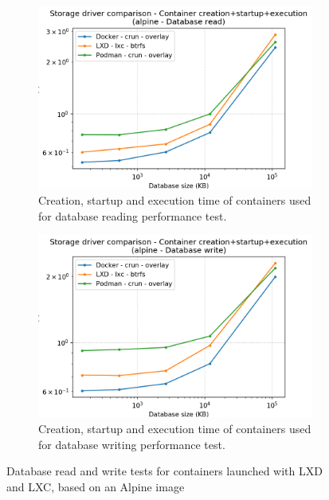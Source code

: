 \begin{figure}[h!]
    \begin{subfigure}{.5\textwidth}
      \centering
      \includegraphics[width=\linewidth]{images/manager/manager-full-alpine---Database-read.png}
      \caption{Creation, startup and execution time of containers used for database reading performance test.}
      \label{fig:manager:db-read-full}
    \end{subfigure}
    \begin{subfigure}{.5\textwidth}
      \centering
      \includegraphics[width=\linewidth]{images/manager/manager-full-alpine---Database-write.png}
      \caption{Creation, startup and execution time of containers used for database writing performance test.}
      \label{fig:manager:db-write-full}
    \end{subfigure}
    
    \caption{Database read and write tests for containers launched with LXD and LXC, based on an Alpine image}
    \label{fig:manager:db}
\end{figure}


